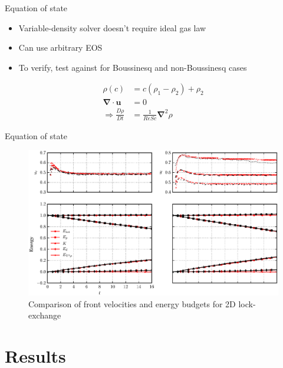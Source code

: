 \documentclass[presentation]{beamer}
\begin{document}
\begin{frame}[label={sec:orgebde279}]{Equation of state}
\begin{itemize}
\item Variable-density solver doesn't require ideal gas law
\item Can use arbitrary EOS
\item To verify, test against \cite{Birman2005} for Boussinesq and non-Boussinesq cases
\end{itemize}
\begin{align*}
  \rho \left( c \right) &= c \left( \rho_1 - \rho_2 \right) + \rho_2 \\
  \boldsymbol{\nabla}\cdot\boldsymbol{u} &= 0 \\
  \Rightarrow \frac{D\rho}{Dt} &= \frac{1}{ReSc} {\boldsymbol{\nabla}}^2 \rho
\end{align*}
\end{frame}

\begin{frame}[label={sec:orgee54188}]{Equation of state}
\begin{figure}[htbp]
\centering
\includegraphics[width=.9\linewidth]{./figures/front_velocity_ebudg_veri.eps}
\caption{Comparison of front velocities and energy budgets for 2D lock-exchange}
\end{figure}
\end{frame}

\section{Results}
\label{sec:org5b3bf26}
\end{document}
